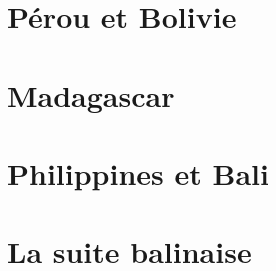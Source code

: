 \documentclass[a5paper, 10pt]{book}
\begin{document}
\begin{spacing}{1}
\pagebreak

\chapter{Pérou et Bolivie}
%

\pagebreak
\pagebreak
\pagebreak

\chapter{Madagascar}

\pagebreak
\pagebreak
\pagebreak

\chapter{Philippines et Bali}

\pagebreak
\pagebreak
\pagebreak
\pagebreak

\chapter{La suite balinaise}



\end{spacing}
\backmatter
\end{document}
